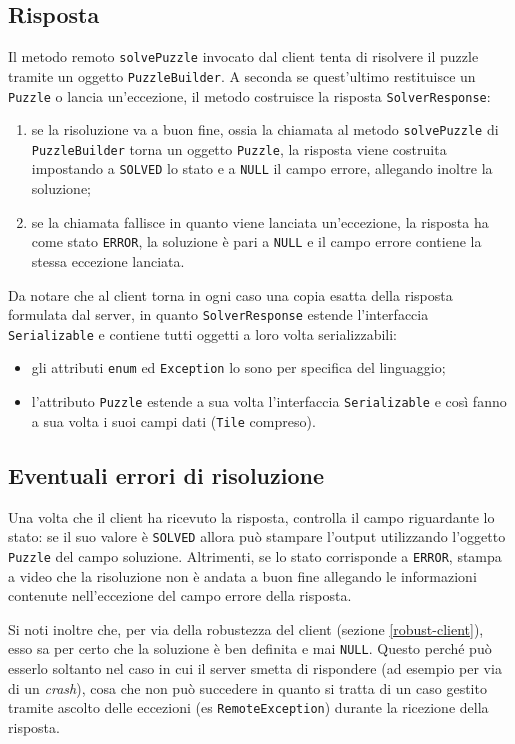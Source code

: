 \documentclass[a4paper, 12pt]{article}
\begin{document}
\subsection{Risposta}
\label{server-response}
Il metodo remoto \verb|solvePuzzle| invocato dal client tenta di risolvere il
puzzle tramite un oggetto \verb|PuzzleBuilder|. A seconda se quest'ultimo
restituisce un \verb|Puzzle| o lancia un'eccezione, il metodo costruisce la
risposta \verb|SolverResponse|:
\begin{enumerate}
\item se la risoluzione va a buon fine, ossia la chiamata al metodo
\verb|solvePuzzle| di \verb|PuzzleBuilder| torna un oggetto \verb|Puzzle|, la
risposta viene costruita impostando a \verb|SOLVED| lo stato e a \verb|NULL| il
campo errore, allegando inoltre la soluzione;
\item se la chiamata fallisce in quanto viene lanciata un'eccezione, la risposta
ha come stato \verb|ERROR|, la soluzione è pari a \verb|NULL| e il campo
errore contiene la stessa eccezione lanciata.
\end{enumerate}

Da notare che al client torna in ogni caso una copia esatta della risposta
formulata dal server, in quanto \verb|SolverResponse| estende l'interfaccia
\verb|Serializable| e contiene tutti oggetti a loro volta serializzabili:
\begin{itemize}
\item gli attributi \verb|enum| ed \verb|Exception| lo sono per specifica del
linguaggio;
\item l'attributo \verb|Puzzle| estende a sua volta l'interfaccia
\verb|Serializable| e così fanno a sua volta i suoi campi dati (\verb|Tile|
compreso).
\end{itemize}
\subsection{Eventuali errori di risoluzione}
Una volta che il client ha ricevuto la risposta, controlla il campo riguardante
lo stato: se il suo valore è \verb|SOLVED| allora può stampare l'output
utilizzando l'oggetto \verb|Puzzle| del campo soluzione. Altrimenti, se lo stato
corrisponde a \verb|ERROR|, stampa a video che la risoluzione non è andata a
buon fine allegando le informazioni contenute nell'eccezione del campo errore
della risposta.

Si noti inoltre che, per via della robustezza del client (sezione
\ref{robust-client}), esso sa per certo che la soluzione è ben definita e
mai \verb|NULL|. Questo perché può esserlo soltanto nel caso in cui il server
smetta di rispondere (ad esempio per via di un \emph{crash}), cosa che non può
succedere in quanto si tratta di un caso gestito tramite ascolto delle eccezioni
(es \verb|RemoteException|) durante la ricezione della risposta.
\end{document}
